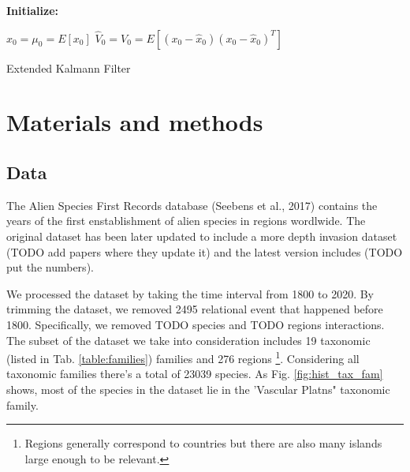 \documentclass[mscthesis]{usiinfthesis}
\begin{document}
\begin{algorithm}[H]
\textbf{Initialize: }
\begin{substeps}
$\hat{x}_0 = \mu_0 = E[x_0]$ \;
$\hat{V}_0 = V_0 = E[(x_0-\hat{x}_0)(x_0-\hat{x}_0)^T]$  \;
\end{substeps}
  \caption{Extended Kalmann Filter}
  \label{algo:kalmann}
\end{algorithm}


\chapter{Materials and methods}

\section{Data}

The Alien Species First Records database (Seebens et al., 2017) contains the years of the first enstablishment of alien species in regions wordlwide. The original dataset has been later updated to include a more depth invasion dataset (TODO add papers where they update it) and the latest version includes (TODO put the numbers). 

We processed the dataset by taking the time interval from 1800 to 2020. By trimming the dataset, we removed 2495 relational event that happened before 1800. Specifically, we removed TODO species and TODO regions interactions. The subset of the dataset we take into consideration includes 19 taxonomic (listed in Tab. \ref{table:families}) families and 276 regions \footnote{Regions generally correspond to countries but there are also many islands large enough to be relevant.}. Considering all taxonomic families there's a total of 23039 species. As Fig. \ref{fig:hist_tax_fam} shows, most of the species in the dataset lie in the 'Vascular Platns" taxonomic family.
\end{document}
